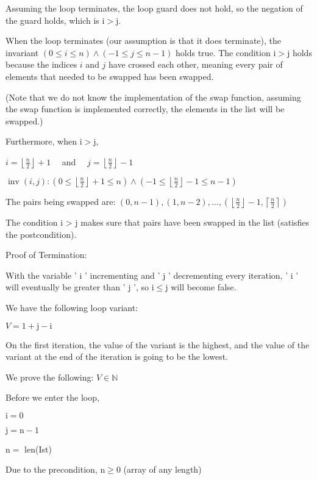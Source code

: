 \documentclass[10pt]{article}
\begin{document}
Assuming the loop terminates, the loop guard does not hold, so the negation of the guard holds, which is $\mathrm{i}>\mathrm{j}$.

When the loop terminates (our assumption is that it does terminate), the invariant $(0 \leq i \leq n) \wedge(-1 \leq j \leq n-1)$ holds true. The condition $\mathrm{i}>\mathrm{j}$ holds because the indices $i$ and $j$ have crossed each other, meaning every pair of elements that needed to be swapped has been swapped.

(Note that we do not know the implementation of the swap function, assuming the swap function is implemented correctly, the elements in the list will be swapped.)

Furthermore, when $\mathrm{i}>\mathrm{j}$,

$i=\left\lfloor\frac{n}{2}\right\rfloor+1 \quad$ and $\quad j=\left\lfloor\frac{n}{2}\right\rfloor-1$

$\operatorname{inv}(i, j):\left(0 \leq\left\lfloor\frac{n}{2}\right\rfloor+1 \leq n\right) \wedge\left(-1 \leq\left\lfloor\frac{n}{2}\right\rfloor-1 \leq n-1\right)$

The pairs being swapped are: $(0, n-1),(1, n-2), \ldots,\left(\left\lfloor\frac{n}{2}\right\rfloor-1,\left\lceil\frac{n}{2}\right\rceil\right)$

The condition $\mathrm{i}$ > $\mathrm{j}$ makes sure that pairs have been swapped in the list (satisfies the postcondition).

Proof of Termination:

With the variable ' $\mathrm{i}$ ' incrementing and ' $\mathrm{j}$ ' decrementing every iteration, ' $\mathrm{i}$ ' will eventually be greater than ' $\mathrm{j}$ ', so $\mathrm{i} \leq \mathrm{j}$ will become false.

We have the following loop variant:

$V=1+\mathrm{j}-\mathrm{i}$

On the first iteration, the value of the variant is the highest, and the value of the variant at the end of the iteration is going to be the lowest.

We prove the following: $V \in \mathbb{N}$

Before we enter the loop,

$\mathrm{i}=0$

$\mathrm{j}=\mathrm{n}-1$

$\mathrm{n}=$ len(Ist)

Due to the precondition, $\mathrm{n} \geq 0$ (array of any length)
\end{document}

